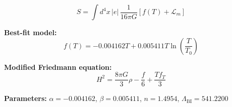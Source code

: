 
\begin{equation}
  S = \int d^4x \, |e| \, \frac{1}{16\pi G} \left[ f(T) + \mathcal{L}_m \right]
\end{equation}

\textbf{Best-fit model:}
\begin{equation}
  f(T) = -0.004162 T + 0.005411 T \ln\!\left(\frac{T}{T_0}\right)
\end{equation}

\textbf{Modified Friedmann equation:}
\begin{equation}
  H^2 = \frac{8\pi G}{3} \rho - \frac{f}{6} + \frac{T f_T}{3}
\end{equation}

\textbf{Parameters:}
$\alpha = -0.004162$, \quad
$\beta = 0.005411$, \quad
$n = 1.4954$, \quad
$\Lambda_{\text{BI}} = 541.2200$